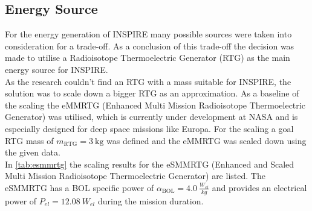 \subsection{Energy Source}
For the energy generation of INSPIRE many possible sources were taken into consideration for a trade-off. As a conclusion of this trade-off the decision was made to utilise a Radioisotope Thermoelectric Generator (RTG) as the main energy source for INSPIRE.\\
As the research couldn't find an RTG with a mass suitable for INSPIRE, the solution was to scale down a bigger RTG as an approximation. As a baseline of the scaling the eMMRTG (Enhanced Multi Mission Radioisotope Thermoelectric Generator) was utilised, which is currently under development at NASA and is especially designed for deep space missions like Europa. For the scaling a goal RTG mass of $m_\text{RTG}=3 \ \text{kg}$ was defined and the eMMRTG was scaled down using the given data.\\
In \autoref{tab:esmmrtg} the scaling results for the eSMMRTG (Enhanced and Scaled Multi Mission Radioisotope Thermoelectric Generator) are listed. The eSMMRTG has a BOL specific power of $\alpha_\text{BOL}= 4.0 \ \frac{W_{el}}{kg}$ and provides an electrical power of $P_{el} = 12.08 \ W_{el}$ during the mission duration\cite{R.Abelsonetal..2004}\cite{S.Magdum.2019}\cite{Holgate.2015}\cite{eMMRTG.NASA}\cite{Lakdawalla.2018}.




%

